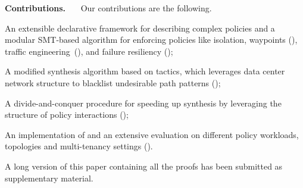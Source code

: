 \noindent \textbf{Contributions.} \ \ \ Our contributions are the following.
\begin{compactitemize}
\item An extensible declarative framework for describing
  complex policies and a modular SMT-based algorithm for enforcing policies
  like isolation, waypoints (), traffic engineering~(), and 
  failure resiliency ();
\item A modified synthesis algorithm based on tactics, which leverages data center network structure
  to blacklist undesirable path patterns ();
\item A divide-and-conquer procedure for speeding up synthesis by leveraging the 
structure of policy interactions ();
\item An implementation of \Name and an extensive evaluation on different policy workloads, topologies and multi-tenancy settings ().
\end{compactitemize}

\iffull\else
A long version
of this paper containing all the proofs has been submitted as supplementary material.
\fi
